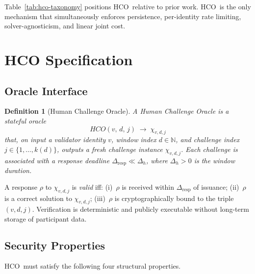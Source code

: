 \documentclass[11pt]{article}
\newcommand{\HCO}{HCO\xspace}
\newtheorem{definition}{Definition}
\theoremstyle{remark}
\theoremstyle{plain}
\begin{document}
	Table~\ref{tab:hco-taxonomy} positions \HCO\ relative to prior work.
	\HCO\ is the only mechanism that simultaneously enforces persistence,
	per-identity rate limiting, solver-agnosticism, and linear joint cost.
	
	
	\section{HCO Specification}
	\label{sec:spec}
	
	\subsection{Oracle Interface}
	
	\begin{definition}[Human Challenge Oracle]
		\label{def:hco}
		A \emph{Human Challenge Oracle} is a stateful oracle
		\[
		\HCO(v,\, d,\, j) \;\longrightarrow\; \chi_{v,d,j}
		\]
		that, on input a validator identity $v$, window index $d \in \mathbb{N}$,
		and challenge index $j \in \{1,\ldots,k(d)\}$, outputs a fresh challenge
		instance $\chi_{v,d,j}$. Each challenge is associated with a response
		deadline $\Delta_{\mathrm{resp}} \ll \Delta_h$, where $\Delta_h > 0$ is
		the window duration.
	\end{definition}
	
	A response $\rho$ to $\chi_{v,d,j}$ is \emph{valid} iff:
	(i)~$\rho$ is received within $\Delta_{\mathrm{resp}}$ of issuance;
	(ii)~$\rho$ is a correct solution to $\chi_{v,d,j}$;
	(iii)~$\rho$ is cryptographically bound to the triple $(v,d,j)$.
	Verification is deterministic and publicly executable without long-term
	storage of participant data.
	
	\subsection{Security Properties}
	
	\HCO\ must satisfy the following four structural properties.
	
\end{document}
